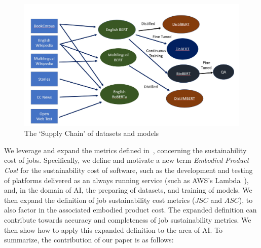 {    \begin{figure}[!t]
        \centering
        \includegraphics[trim = {0.3in 0.12in 0.2in 0.4in}, clip, width = \linewidth]{Figures/sustain1.jpg}
        \caption{The `Supply Chain' of datasets and models}
        \label{fig:model_supply_chain}
    \end{figure}

    We leverage and expand the metrics defined in~\cite{Gandhi2022}, concerning the sustainability cost of jobs. Specifically, we define and motivate a new term \textit{Embodied Product Cost} for the sustainability cost of software, such as the development and testing of platforms delivered as an always running service (such as AWS's Lambda~\cite{Lambda}), and, in the domain of AI, the preparing of datasets, and training of models. We then expand the definition of job sustainability cost metrics ($JSC$ and $ASC$), to also factor in the associated embodied product cost. The expanded definition can contribute towards accuracy and completeness of job sustainability metrics. We then show how to apply this expanded definition to the area of AI. To summarize, the contribution of our paper is as follows:

}
